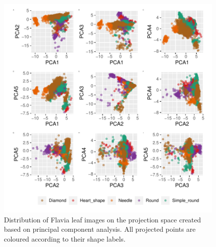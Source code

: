 \documentclass{article}
\begin{document}
\begin{figure}
\centering
\includegraphics{img/pcaflavia-1.pdf}
\caption{\label{pcaflavia}Distribution of Flavia leaf images on the
projection space created based on principal component analysis. All
projected points are coloured according to their shape labels.}
\end{figure}
\end{document}
